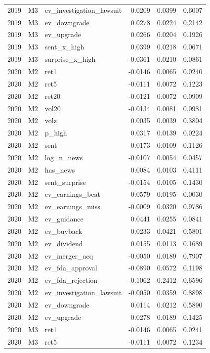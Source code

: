 \begin{tabular}{rllrrr}
2019 & M3 & ev\_investigation\_lawsuit & 0.0209 & 0.0399 & 0.6007 \\
2019 & M3 & ev\_downgrade & 0.0278 & 0.0224 & 0.2142 \\
2019 & M3 & ev\_upgrade & 0.0266 & 0.0204 & 0.1926 \\
2019 & M3 & sent\_x\_high & 0.0399 & 0.0218 & 0.0671 \\
2019 & M3 & surprise\_x\_high & -0.0361 & 0.0210 & 0.0861 \\
2020 & M2 & ret1 & -0.0146 & 0.0065 & 0.0240 \\
2020 & M2 & ret5 & -0.0111 & 0.0072 & 0.1223 \\
2020 & M2 & ret20 & -0.0121 & 0.0072 & 0.0909 \\
2020 & M2 & vol20 & -0.0134 & 0.0081 & 0.0981 \\
2020 & M2 & volz & 0.0035 & 0.0039 & 0.3804 \\
2020 & M2 & p\_high & 0.0317 & 0.0139 & 0.0224 \\
2020 & M2 & sent & 0.0173 & 0.0109 & 0.1126 \\
2020 & M2 & log\_n\_news & -0.0107 & 0.0054 & 0.0457 \\
2020 & M2 & has\_news & 0.0084 & 0.0103 & 0.4111 \\
2020 & M2 & sent\_surprise & -0.0154 & 0.0105 & 0.1430 \\
2020 & M2 & ev\_earnings\_beat & 0.0579 & 0.0195 & 0.0030 \\
2020 & M2 & ev\_earnings\_miss & -0.0009 & 0.0320 & 0.9786 \\
2020 & M2 & ev\_guidance & 0.0441 & 0.0255 & 0.0841 \\
2020 & M2 & ev\_buyback & 0.0233 & 0.0421 & 0.5801 \\
2020 & M2 & ev\_dividend & 0.0155 & 0.0113 & 0.1689 \\
2020 & M2 & ev\_merger\_acq & -0.0050 & 0.0189 & 0.7907 \\
2020 & M2 & ev\_fda\_approval & -0.0890 & 0.0572 & 0.1198 \\
2020 & M2 & ev\_fda\_rejection & -0.1062 & 0.2412 & 0.6596 \\
2020 & M2 & ev\_investigation\_lawsuit & -0.0050 & 0.0359 & 0.8898 \\
2020 & M2 & ev\_downgrade & 0.0114 & 0.0212 & 0.5890 \\
2020 & M2 & ev\_upgrade & 0.0278 & 0.0189 & 0.1425 \\
2020 & M3 & ret1 & -0.0146 & 0.0065 & 0.0241 \\
2020 & M3 & ret5 & -0.0111 & 0.0072 & 0.1234 \\

\end{tabular}

